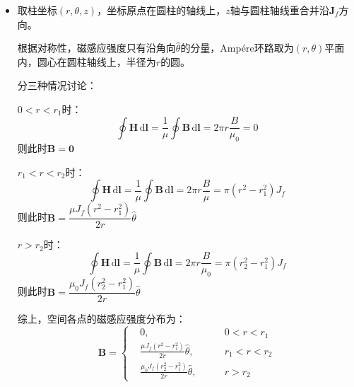 \documentclass[a4paper,fontset=none]{ctexart}
\begin{document}
\begin{itemize}
        \textparagraph 极化面电荷只分布在界面$r = r_1$及$r = r_2$，设其面密度为$\sigma_p$。

        在界面处有以下方程组：（这里法向量$\bm{n} = \bm{r}$）
        \[
            \bm{n}\cdot(\bm{E}_2 - \bm{E}_1) = E_2 - E_1 = \frac{\sigma_f + \sigma_p}{\varepsilon_0}
        \]
        \[
            \bm{n}\cdot(\bm{D}_2 - \bm{D}_1) = D_2 - D_1 = \sigma_f
        \]
        联立解得：
        \[
            \sigma_p = \left\{
            \begin{aligned}
                & 0,\qquad& r = r_1 \\
                & \frac{\rho_f(r_2^3 - r_1^3)}{3r_2^2}\left(1 - \frac{\varepsilon_0}{\varepsilon}\right),\qquad& r = r_2
            \end{aligned}
            \right.
        \]

        \item[8.(1)]
        取柱坐标$(r,\theta,z)$，坐标原点在圆柱的轴线上，$z$轴与圆柱轴线重合并沿$\bm{J}_f$方向。

        根据对称性，磁感应强度只有沿角向$\hat{\theta}$的分量，Amp\'{e}re环路取为$(r,\theta)$平面内，圆心在圆柱轴线上，半径为$r$的圆。

        分三种情况讨论：

        $0 < r < r_1$时：
        \[
            \oint \bm{H}\,\mathrm{d}\bm{l} = \frac{1}{\mu}\oint \bm{B}\,\mathrm{d}\bm{l} = 2\pi r\frac{B}{\mu_0} = 0
        \]
        则此时$\bm{B} = \bm{0}$

        $r_1 < r < r_2$时：
        \[
            \oint \bm{H}\,\mathrm{d}\bm{l} = \frac{1}{\mu}\oint \bm{B}\,\mathrm{d}\bm{l} = 2\pi r\frac{B}{\mu} = \pi(r^2 - r_1^2)J_f
        \]
        则此时$\bm{B} = \dfrac{\mu J_f(r^2 - r_1^2)}{2r}\hat{\theta}$

        $r > r_2$时：
        \[
            \oint \bm{H}\,\mathrm{d}\bm{l} = \frac{1}{\mu}\oint \bm{B}\,\mathrm{d}\bm{l} = 2\pi r\frac{B}{\mu_0} = \pi(r_2^2 - r_1^2)J_f
        \]
        则此时$\bm{B} = \dfrac{\mu_0 J_f(r_2^2 - r_1^2)}{2r}\hat{\theta}$

        综上，空间各点的磁感应强度分布为：
        \[
            \bm{B} = \left\{
            \begin{aligned}
                & 0,\qquad& 0 < r < r_1 \\
                & \frac{\mu J_f(r^2 - r_1^2)}{2r}\hat{\theta},\qquad& r_1 < r < r_2 \\
                & \frac{\mu_0 J_f(r_2^2 - r_1^2)}{2r}\hat{\theta},\qquad& r > r_2
            \end{aligned}
            \right.
        \]


\end{itemize}
\end{document}
